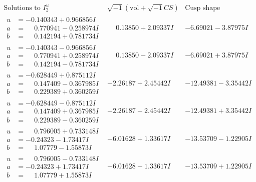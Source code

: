 \documentclass[1p]{elsarticle_modified}
\theoremstyle{definition}
\newcommand{\I}{\sqrt{-1}}
\begin{document}
$$\begin{array}{c|c|c}  
\text{Solutions to }I^u_{2}& \I (\text{vol} + \sqrt{-1}CS) & \text{Cusp shape}\\
 \hline 
\begin{aligned}
u &= -0.140343 + 0.966856 I \\
a &= \phantom{-}0.770941 - 0.258974 I \\
b &= \phantom{-}0.142194 + 0.781734 I\end{aligned}
 & \phantom{-}0.13850 + 2.09337 I & -6.69021 - 3.87975 I \\ \hline\begin{aligned}
u &= -0.140343 - 0.966856 I \\
a &= \phantom{-}0.770941 + 0.258974 I \\
b &= \phantom{-}0.142194 - 0.781734 I\end{aligned}
 & \phantom{-}0.13850 - 2.09337 I & -6.69021 + 3.87975 I \\ \hline\begin{aligned}
u &= -0.628449 + 0.875112 I \\
a &= \phantom{-}0.147409 - 0.367985 I \\
b &= \phantom{-}0.229389 + 0.360259 I\end{aligned}
 & -2.26187 + 2.45442 I & -12.49381 - 3.35442 I \\ \hline\begin{aligned}
u &= -0.628449 - 0.875112 I \\
a &= \phantom{-}0.147409 + 0.367985 I \\
b &= \phantom{-}0.229389 - 0.360259 I\end{aligned}
 & -2.26187 - 2.45442 I & -12.49381 + 3.35442 I \\ \hline\begin{aligned}
u &= \phantom{-}0.796005 + 0.733148 I \\
a &= -0.24323 - 1.73417 I \\
b &= \phantom{-}1.07779 - 1.55873 I\end{aligned}
 & -6.01628 + 1.33617 I & -13.53709 - 1.22905 I \\ \hline\begin{aligned}
u &= \phantom{-}0.796005 - 0.733148 I \\
a &= -0.24323 + 1.73417 I \\
b &= \phantom{-}1.07779 + 1.55873 I\end{aligned}
 & -6.01628 - 1.33617 I & -13.53709 + 1.22905 I \\ \hline\begin{aligned}

\end{aligned}
\end{array}$$
\end{document}
